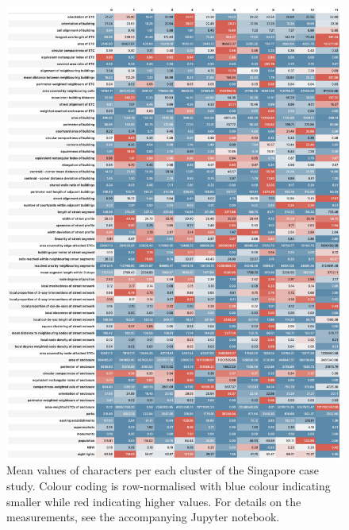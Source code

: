 \begin{figure}
  \includegraphics[width=\linewidth]{figures/singapore_means.png}
  \caption{Mean values of characters per each cluster of the Singapore case study.
  Colour coding is row-normalised with blue colour indicating smaller while red indicating
  higher values. For details on the measurements, see the accompanying Jupyter notebook.
  }
  \label{fig:means_sin}
\end{figure}